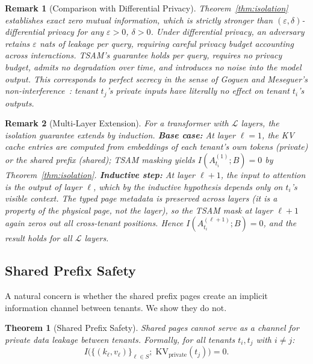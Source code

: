 \documentclass[11pt]{article}
\newtheorem{theorem}{Theorem}
\newtheorem{remark}{Remark}
\begin{document}
\begin{remark}[Comparison with Differential Privacy]
\label{rem:dp-comparison}
Theorem~\ref{thm:isolation} establishes \emph{exact} zero mutual information, which is
strictly stronger than $(\varepsilon, \delta)$-differential privacy for any
$\varepsilon > 0$, $\delta > 0$. Under differential privacy, an adversary retains
$\varepsilon$ nats of leakage per query, requiring careful privacy budget accounting
across interactions. TSAM's guarantee holds \emph{per query}, requires no privacy budget,
admits no degradation over time, and introduces no noise into the model output. This
corresponds to \emph{perfect secrecy} in the sense of Goguen and Meseguer's
non-interference~\cite{goguen1982security}: tenant $t_j$'s private inputs have
\emph{literally no effect} on tenant $t_i$'s outputs.
\end{remark}

\begin{remark}[Multi-Layer Extension]
\label{rem:multilayer}
For a transformer with $\mathcal{L}$ layers, the isolation guarantee extends by induction.
\textbf{Base case:} At layer $\ell = 1$, the KV cache entries are computed from embeddings
of each tenant's own tokens (private) or the shared prefix (shared); TSAM masking yields
$I(A^{(1)}_{t_i}; B) = 0$ by Theorem~\ref{thm:isolation}. \textbf{Inductive step:}
At layer $\ell + 1$, the input to attention is the output of layer $\ell$, which by the
inductive hypothesis depends only on $t_i$'s visible context. The typed page metadata is
preserved across layers (it is a property of the physical page, not the layer), so the
TSAM mask at layer $\ell + 1$ again zeros out all cross-tenant positions. Hence
$I(A^{(\ell+1)}_{t_i}; B) = 0$, and the result holds for all $\mathcal{L}$ layers.
\end{remark}

\subsection{Shared Prefix Safety}
\label{sec:formal:shared}

A natural concern is whether the shared prefix pages create an implicit information channel
between tenants. We show they do not.

\begin{theorem}[Shared Prefix Safety]
\label{thm:shared-safety}
Shared pages cannot serve as a channel for private data leakage between tenants. Formally,
for all tenants $t_i, t_j$ with $i \neq j$:
\begin{equation}
    I\!\big(\{(k_\ell, v_\ell)\}_{\ell \in S};\; \mathrm{KV}_{\mathrm{private}}(t_j)\big) = 0.
\end{equation}
\end{theorem}
\end{document}
